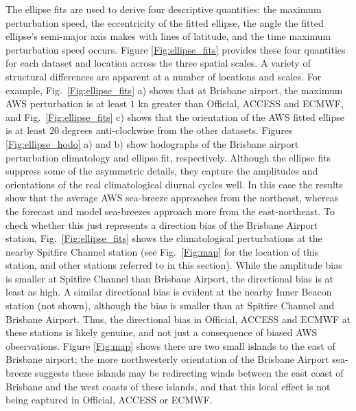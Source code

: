 \documentclass{ametsoc}
\begin{document}
The ellipse fits are used to derive four descriptive quantities: the maximum perturbation speed, the eccentricity of the fitted ellipse, the angle the fitted ellipse's semi-major axis makes with lines of latitude, and the time maximum perturbation speed occurs. Figure \ref{Fig:ellipse_fits} provides these four quantities for each dataset and location across the three spatial scales. A variety of structural differences are apparent at a number of locations and scales. For example, Fig.~\ref{Fig:ellipse_fits} a) shows that at Brisbane airport, the maximum AWS perturbation is at least $1$ kn greater than Official, ACCESS and ECMWF, and Fig.~\ref{Fig:ellipse_fits} c) shows that the orientation of the AWS fitted ellipse is at least 20 degrees anti-clockwise from the other datasets. Figures \ref{Fig:ellipse_hodo} a) and b) show hodographs of the Brisbane airport perturbation climatology and ellipse fit, respectively. Although the ellipse fits suppress some of the asymmetric details, they capture the amplitudes and orientations of the real climatological diurnal cycles well. In this case the results show that the average AWS sea-breeze approaches from the northeast, whereas the forecast and model sea-breezes approach more from the east-northeast. To check whether this just represents a direction bias of the Brisbane Airport station, Fig.~\ref{Fig:ellipse_fits} shows the climatological perturbations at the nearby Spitfire Channel station (see Fig.~\ref{Fig:map} for the location of this station, and other stations referred to in this section). While the amplitude bias is smaller at Spitfire Channel than Brisbane Airport, the directional bias is at least as high. A similar directional bias is evident at the nearby Inner Beacon station (not shown), although the bias is smaller than at Spitfire Channel and Brisbane Airport. Thus, the directional bias in Official, ACCESS and ECMWF at these stations is likely genuine, and not just a consequence of biased AWS observations. Figure \ref{Fig:map} shows there are two small islands to the east of Brisbane airport; the more northwesterly orientation of the Brisbane Airport sea-breeze suggests these islands may be redirecting winds between the east coast of Brisbane and the west coasts of these islands, and that this local effect is not being captured in Official, ACCESS or ECMWF.            
\end{document}

